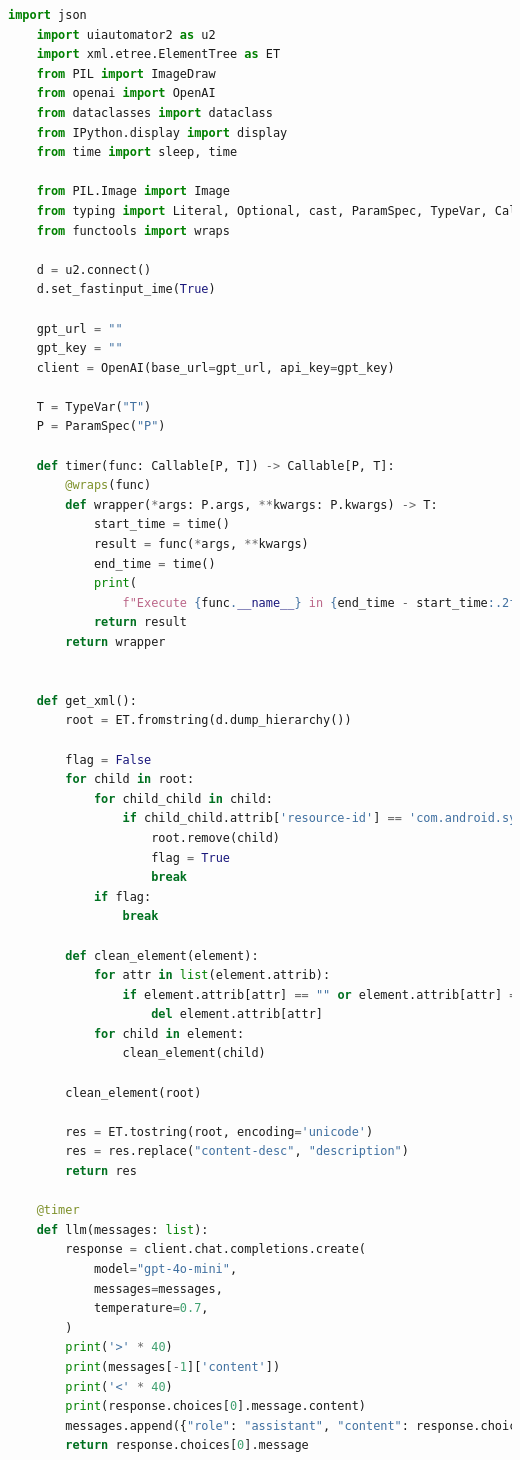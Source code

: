\documentclass{article}
\begin{document}
\begin{lstlisting}[language=Python]
    import json
    import uiautomator2 as u2
    import xml.etree.ElementTree as ET
    from PIL import ImageDraw
    from openai import OpenAI
    from dataclasses import dataclass
    from IPython.display import display
    from time import sleep, time
    
    from PIL.Image import Image
    from typing import Literal, Optional, cast, ParamSpec, TypeVar, Callable
    from functools import wraps
    
    d = u2.connect()
    d.set_fastinput_ime(True)
    
    gpt_url = ""
    gpt_key = ""
    client = OpenAI(base_url=gpt_url, api_key=gpt_key)
    
    T = TypeVar("T")
    P = ParamSpec("P")
    
    def timer(func: Callable[P, T]) -> Callable[P, T]:
        @wraps(func)
        def wrapper(*args: P.args, **kwargs: P.kwargs) -> T:
            start_time = time()
            result = func(*args, **kwargs)
            end_time = time()
            print(
                f"Execute {func.__name__} in {end_time - start_time:.2f} seconds")
            return result
        return wrapper
    

    def get_xml():
        root = ET.fromstring(d.dump_hierarchy())
    
        flag = False
        for child in root:
            for child_child in child:
                if child_child.attrib['resource-id'] == 'com.android.systemui:id/status_bar_container':
                    root.remove(child)
                    flag = True
                    break
            if flag:
                break
            
        def clean_element(element):
            for attr in list(element.attrib):
                if element.attrib[attr] == "" or element.attrib[attr] == "false":
                    del element.attrib[attr]
            for child in element:
                clean_element(child)
                
        clean_element(root)
    
        res = ET.tostring(root, encoding='unicode')
        res = res.replace("content-desc", "description")
        return res
    
    @timer
    def llm(messages: list):
        response = client.chat.completions.create(
            model="gpt-4o-mini",
            messages=messages,
            temperature=0.7,
        )
        print('>' * 40)
        print(messages[-1]['content'])
        print('<' * 40)
        print(response.choices[0].message.content)
        messages.append({"role": "assistant", "content": response.choices[0].message.content})
        return response.choices[0].message
    


\end{lstlisting}
\end{document}
